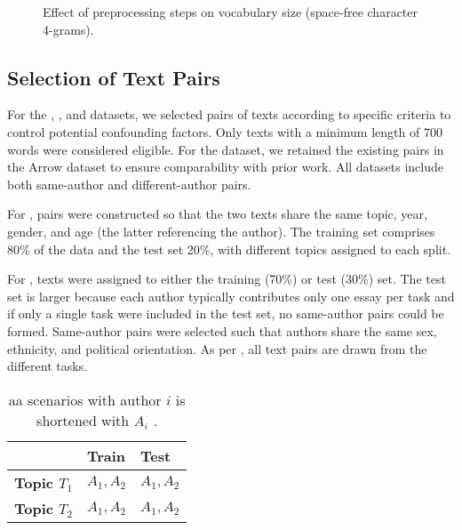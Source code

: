 \begin{figure}[htbp]
    \centering
    
    \caption{Effect of preprocessing steps on vocabulary size (space-free character 4-grams).}
    \label{fig:preprocesing_impact_vocab_size}
\end{figure}


\subsection{Selection of Text Pairs}
\label{subsec:dataset_text_pair_selection}

For the \dataBlog{}, \dataStudent{}, and \dataGutenberg{} datasets, we selected pairs of texts according to specific criteria to control potential confounding factors.
Only texts with a minimum length of \num{700} words were considered eligible. 
For the \dataPan{} dataset, we retained the existing pairs in the Arrow dataset to ensure comparability with prior work. 
All datasets include both same-author and different-author pairs. 

For \dataBlog{}, pairs were constructed so that the two texts share the same topic, year, gender, and age (the latter referencing the author). 
The training set comprises 80\% of the data and the test set 20\%, with different topics assigned to each split.

For \dataStudent{}, texts were assigned to either the training (70\%) or test (30\%) set. 
The test set is larger because each author typically contributes only one essay per task and if only a single task were included in the test set, no same-author pairs could be formed. 
Same-author pairs were selected such that authors share the same sex, ethnicity, and political orientation. 
As per \citep{koppel_determining_2014}, all text pairs are drawn from the different tasks.



\begin{table}[tbp]
    \centering
    \caption{\ac{aa} scenarios with author $i$ is shortened with $A_i$ \citep{altakrori_topic_2021}.}
    \label{tab:aa_same_topic}
    \begin{tabular}{|l|l|l|}
    \hline
    \textbf{} & \textbf{Train} & \textbf{Test} \\ \hline
    \textbf{Topic $T_1$} & $A_1, A_2$ & $A_1, A_2$ \\ \hline
    \textbf{Topic $T_2$} & $A_1, A_2$ & $A_1, A_2$ \\ \hline
    \end{tabular}%
\end{table}

